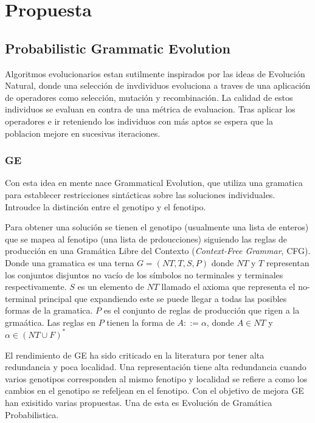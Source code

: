 \chapter{Propuesta}\label{chapter:proposal}

\section{Probabilistic Grammatic Evolution}

Algoritmos evolucionarios estan sutilmente inspirados por las ideas de Evoluci\'on Natural, donde una selecci\'on de invdividuos evoluciona a traves de una aplicaci\'on de operadores como selecci\'on, mutaci\'on y recombinaci\'on. La calidad de estos individuos se evaluan en contra de una m\'etrica de evaluacion. Tras aplicar los operadores e ir reteniendo los individuos con m\'as aptos se espera que la poblacion mejore en sucesivas iteraciones.

\subsection{GE}
Con esta idea en mente nace Grammatical Evolution, que utiliza una gramatica para establecer restricciones sint\'acticas sobre las soluciones individuales. Introudce la distinci\'on entre el genotipo y el fenotipo. 

Para obtener una soluci\'on se tienen el genotipo (usualmente una lista de enteros) que se mapea al fenotipo (una lista de prdoucciones) siguiendo las reglas de producci\'on en una Gram\'atica Libre del Contexto (\textit{Context-Free Grammar}, CFG). Donde una gramatica es una terna $G = (NT, T, S, P)$ donde $NT$ y $T$ representan los conjuntos disjuntos no vac\'io de los s\'imbolos no terminales y terminales respectivamente. $S$ es un elemento de $NT$ llamado el axioma que representa el no-terminal principal que expandiendo este se puede llegar a todas las posibles formas de la gramatica. $P$ es el conjunto de reglas de producci\'on que rigen a la grma\'atica. Las reglas en $P$ tienen la forma de $A ::= \alpha$, donde $A \in NT$ y  $\alpha \in (NT \cup F)^*$ 


El rendimiento de GE ha sido criticado en la literatura por tener alta redundancia y poca localidad. Una representaci\'on tiene alta redundancia cuando varios genotipos corresponden al mismo fenotipo y localidad se refiere a como los cambios en el genotipo se refeljean en el fenotipo. Con el objetivo de mejora GE han exisitido varias propuestas. Una de esta es Evoluci\'on de Gram\'atica Probabilistica.


